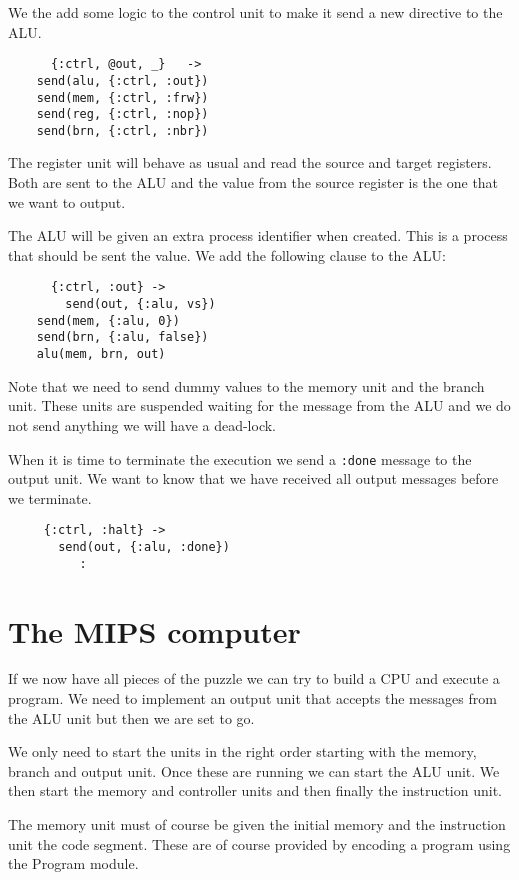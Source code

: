 \documentclass[a4paper,11pt]{article}
\begin{document}
We the add some logic to the control unit to make it send a new directive to the ALU. 

\begin{verbatim}
      {:ctrl, @out, _}   ->
	send(alu, {:ctrl, :out})
	send(mem, {:ctrl, :frw})
	send(reg, {:ctrl, :nop})
	send(brn, {:ctrl, :nbr})
\end{verbatim}

The register unit will behave as usual and read the source and target
registers. Both are sent to the ALU and the value from the source
register is the one that we want to output.

The ALU will be given an extra process identifier when created. This
is a process that should be sent the value. We add the following clause to the ALU:

\begin{verbatim}
      {:ctrl, :out} ->
        send(out, {:alu, vs})
	send(mem, {:alu, 0})
	send(brn, {:alu, false})
	alu(mem, brn, out)
\end{verbatim}

Note that we need to send dummy values to the memory unit and the
branch unit. These units are suspended waiting for the message from the
ALU and we do not send anything we will have a dead-lock.

When it is time to terminate the execution we send a {\tt :done}
message to the output unit. We want to know that we have received all
output messages before we terminate.

\begin{verbatim}
     {:ctrl, :halt} ->
       send(out, {:alu, :done})
          :
\end{verbatim}


\section{The MIPS computer}

If we now have all pieces of the puzzle we can try to build a CPU and
execute a program. We need to implement an output unit that accepts
the messages from the ALU unit but then we are set to go.

We only need to start the units in the right order starting with the
memory, branch and output unit. Once these are running we can start
the ALU unit. We then start the memory and controller units and then
finally the instruction unit.

The memory unit must of course be given the initial memory and the
instruction unit the code segment. These are of course provided by
encoding a program using the Program module.
\end{document}
